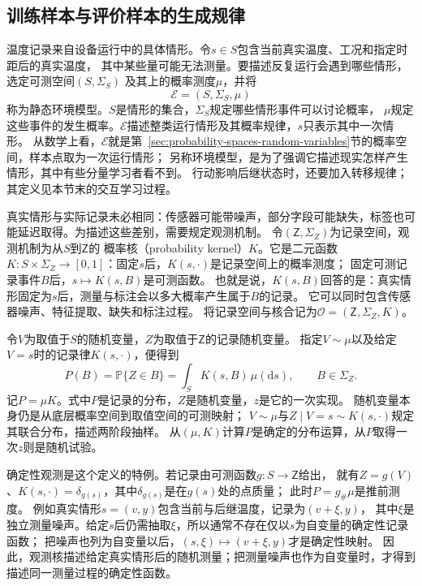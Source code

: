 \subsection{训练样本与评价样本的生成规律}
\label{sec:future-learning-data-objects}

温度记录来自设备运行中的具体情形。令$s\in S$包含当前真实温度、工况和指定时距后的真实温度，
其中某些量可能无法测量。要描述反复运行会遇到哪些情形，选定可测空间$(S,\Sigma_S)$
及其上的概率测度$\mu$，并将
\begin{equation}
  \mathcal E=(S,\Sigma_S,\mu)
  \label{eq:future-static-environment}
\end{equation}
称为静态环境模型。$S$是情形的集合，$\Sigma_S$规定哪些情形事件可以讨论概率，
$\mu$规定这些事件的发生概率。$\mathcal E$描述整类运行情形及其概率规律，$s$只表示其中一次情形。
从数学上看，$\mathcal E$就是第~\ref{sec:probability-spaces-random-variables}节的概率空间，样本点取为一次运行情形；
另称环境模型，是为了强调它描述现实怎样产生情形，其中有些分量学习者看不到。
行动影响后继状态时，还要加入转移规律；其定义见本节末的交互学习过程。

真实情形与实际记录未必相同：传感器可能带噪声，部分字段可能缺失，标签也可能延迟取得。为描述这些差别，需要规定观测机制。
令$(\mathsf Z,\Sigma_Z)$为记录空间，观测机制为从$S$到$\mathsf Z$的
概率核（probability kernel）$K$。它是二元函数
$K:S\times\Sigma_Z\to[0,1]$：固定$s$后，$K(s,\cdot)$是记录空间上的概率测度；
固定可测记录事件$B$后，$s\mapsto K(s,B)$是可测函数。
也就是说，$K(s,B)$回答的是：真实情形固定为$s$后，测量与标注会以多大概率产生属于$B$的记录。
它可以同时包含传感器噪声、特征提取、缺失和标注过程。
将记录空间与核合记为$\mathcal O=(\mathsf Z,\Sigma_Z,K)$。

令$V$为取值于$S$的随机变量，$Z$为取值于$\mathsf Z$的记录随机变量。
指定$V\sim\mu$以及给定$V=s$时的记录律$K(s,\cdot)$，便得到
\begin{equation}
  P(B)=\mathbb P\{Z\in B\}
      =\int_S K(s,B)\,\mu(\mathrm ds),
  \qquad B\in\Sigma_Z.
  \label{eq:future-observation-law}
\end{equation}
记$P=\mu K$。式中$P$是记录的分布，$Z$是随机变量，$z$是它的一次实现。
随机变量本身仍是从底层概率空间到取值空间的可测映射；
$V\sim\mu$与$Z\mid V=s\sim K(s,\cdot)$规定其联合分布，描述两阶段抽样。
从$(\mu,K)$计算$P$是确定的分布运算，从$P$取得一次$z$则是随机试验。

确定性观测是这个定义的特例。若记录由可测函数$g:S\to\mathsf Z$给出，
就有$Z=g(V)$、$K(s,\cdot)=\delta_{g(s)}$，其中$\delta_{g(s)}$是在$g(s)$处的点质量；
此时$P=g_{\#}\mu$是推前测度。
例如真实情形$s=(v,y)$包含当前与后继温度，记录为$(v+\xi,y)$，
其中$\xi$是独立测量噪声。给定$s$后仍需抽取$\xi$，所以通常不存在仅以$s$为自变量的确定性记录函数；
把噪声也列为自变量以后，$(s,\xi)\mapsto(v+\xi,y)$才是确定性映射。
因此，观测核描述给定真实情形后的随机测量；把测量噪声也作为自变量时，才得到描述同一测量过程的确定性函数。

